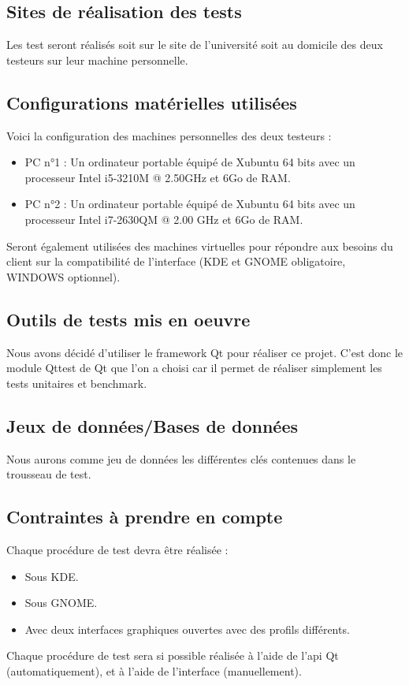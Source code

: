 \documentclass{../res/univ-projet}
\begin{document}
\subsection{Sites de réalisation des tests}
Les test seront réalisés soit sur le site de l'université soit au domicile des deux testeurs sur leur machine personnelle.



\subsection{Configurations matérielles utilisées}
Voici la configuration des machines personnelles des deux testeurs :
\begin{itemize}
 \item PC n°1 : Un ordinateur portable équipé de Xubuntu 64 bits avec un processeur Intel i5-3210M @ 2.50GHz et 6Go de RAM.
 \item PC n°2 : Un ordinateur portable équipé de Xubuntu 64 bits avec un processeur Intel i7-2630QM @ 2.00 GHz et 6Go de RAM.
\end{itemize}
Seront également utilisées des machines virtuelles pour répondre aux besoins du client sur la compatibilité de l'interface (KDE et GNOME obligatoire,
WINDOWS optionnel).

\subsection{Outils de tests mis en oeuvre}
Nous avons décidé d'utiliser le framework Qt pour réaliser ce projet. C'est donc le module Qttest de Qt que l'on a choisi car il permet de réaliser
simplement les tests unitaires et benchmark.

\subsection{Jeux de données/Bases de données}
Nous aurons comme jeu de données les différentes clés contenues dans le trousseau de test.


\subsection{Contraintes à prendre en compte}
Chaque procédure de test devra être réalisée :
\begin{itemize}
 \item Sous KDE.
 \item Sous GNOME.
 \item Avec deux interfaces graphiques ouvertes avec des profils différents.
\end{itemize}
Chaque procédure de test sera si possible réalisée à l'aide de l'api Qt (automatiquement), et à l'aide de l'interface (manuellement).
\end{document}
